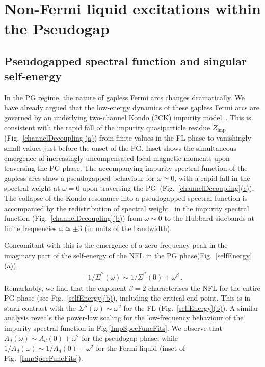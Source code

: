 \section{Non-Fermi liquid excitations within the Pseudogap}\label{NFLproperties}
\subsection{Pseudogapped spectral function and singular self-energy}
In the PG regime, the nature of gapless Fermi arcs changes dramatically. We have already argued that the low-energy dynamics of these gapless Fermi arcs are governed by an underlying two-channel Kondo (2CK) impurity model~\cite{Tsvelick_weigmann_mchannel_1985, emery_kivelson}. This is consistent with the rapid fall of the impurity quasiparticle residue $Z_\text{imp}$ (Fig.~\hyperref[channelDecoupling]{\ref*{channelDecoupling}(a)}) from finite values in the FL phase to vanishingly small values just before the onset of the PG. Inset  shows the simultaneous emergence of increasingly uncompensated local magnetic moments upon traversing the PG phase. The accompanying impurity spectral function of the gapless arcs show a pseudogapped behaviour for $\omega\simeq 0$, with a rapid fall in the spectral weight at $\omega=0$ upon traversing the PG~(Fig.~\hyperref[channelDecoupling]{\ref*{channelDecoupling}(c)}). The collapse of the Kondo resonance into a pseudogapped spectral function is accompanied by the redistribution of spectral weight~\cite{dzyaloshinskii2003some} in the impurity spectral function (Fig.~\hyperref[channelDecoupling]{\ref*{channelDecoupling}(b)}) from $\omega\sim 0$ to the Hubbard sidebands at finite frequencies $\omega\simeq \pm 3$ (in units of the bandwidth). 

Concomitant with this is the emergence of a zero-frequency peak in the imaginary part of the self-energy of the NFL in the PG phase(Fig.~\hyperref[selfEnergy]{\ref*{selfEnergy}(a)}),
\begin{equation}
\begin{aligned}
-1/\Sigma^{\prime\prime}(\omega)\sim 1/\Sigma^{\prime\prime}(0) + \omega^{\beta}~.
\end{aligned}
\end{equation}
Remarkably, we find that the exponent $\beta=2$ characterises the NFL for the entire PG phase (see Fig.~\hyperref[selfEnergy]{\ref*{selfEnergy}(b)}), including the critical end-point. This is in stark contrast with the $\Sigma''(\omega)\sim \omega^{2}$ for the FL (Fig.~\hyperref[selfEnergy]{\ref*{selfEnergy}(b)}). A similar analysis reveals the power-law scaling for the low-frequency behaviour of the impurity spectral function in Fig.\ref{ImpSpecFuncFits}. We observe that $A_{d}(\omega)\sim A_d(0) + \omega^{2}$ for the pseudogap phase, while $1/A_{d}(\omega)\sim 1/A_{d}(0) + \omega^{2}$
for the Fermi liquid (inset of Fig.~\ref{ImpSpecFuncFits}).
